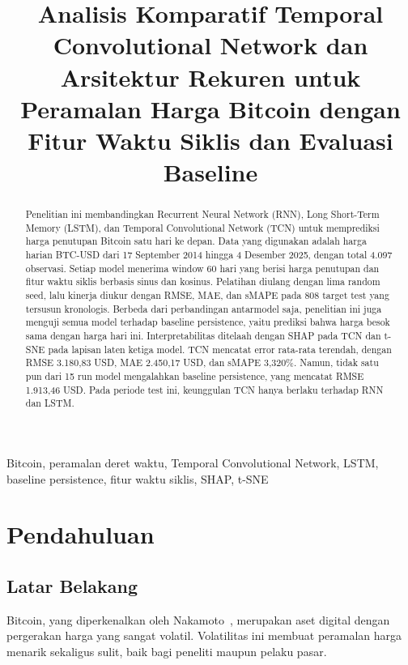 \documentclass[conference,a4paper]{IEEEtran}
\begin{document}
\title{Analisis Komparatif Temporal Convolutional Network dan Arsitektur Rekuren untuk Peramalan Harga Bitcoin dengan Fitur Waktu Siklis dan Evaluasi Baseline}

\author{%
}

\maketitle

\begin{abstract}
Penelitian ini membandingkan Recurrent Neural Network (RNN), Long Short-Term Memory (LSTM), dan Temporal Convolutional Network (TCN) untuk memprediksi harga penutupan Bitcoin satu hari ke depan. Data yang digunakan adalah harga harian BTC-USD dari 17 September 2014 hingga 4 Desember 2025, dengan total 4.097 observasi. Setiap model menerima window 60 hari yang berisi harga penutupan dan fitur waktu siklis berbasis sinus dan kosinus. Pelatihan diulang dengan lima random seed, lalu kinerja diukur dengan RMSE, MAE, dan sMAPE pada 808 target test yang tersusun kronologis. Berbeda dari perbandingan antarmodel saja, penelitian ini juga menguji semua model terhadap baseline persistence, yaitu prediksi bahwa harga besok sama dengan harga hari ini. Interpretabilitas ditelaah dengan SHAP pada TCN dan t-SNE pada lapisan laten ketiga model. TCN mencatat error rata-rata terendah, dengan RMSE 3.180,83 USD, MAE 2.450,17 USD, dan sMAPE 3,320\%. Namun, tidak satu pun dari 15 run model mengalahkan baseline persistence, yang mencatat RMSE 1.913,46 USD. Pada periode test ini, keunggulan TCN hanya berlaku terhadap RNN dan LSTM.
\end{abstract}

\begin{IEEEkeywords}
Bitcoin, peramalan deret waktu, Temporal Convolutional Network, LSTM, baseline persistence, fitur waktu siklis, SHAP, t-SNE
\end{IEEEkeywords}

\section{Pendahuluan}

\subsection{Latar Belakang}
Bitcoin, yang diperkenalkan oleh Nakamoto~\cite{nakamoto2008}, merupakan aset digital dengan pergerakan harga yang sangat volatil. Volatilitas ini membuat peramalan harga menarik sekaligus sulit, baik bagi peneliti maupun pelaku pasar.
\end{document}
